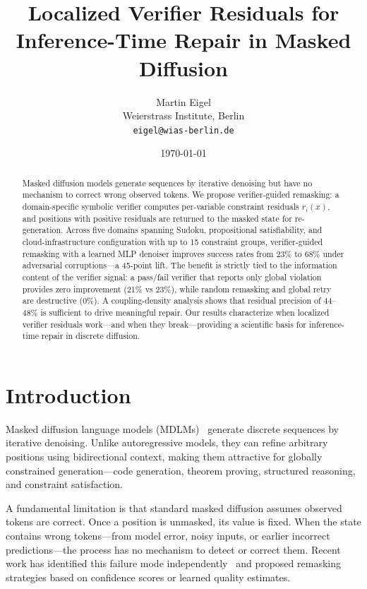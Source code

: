 \documentclass[11pt,a4paper,twoside]{article}
\title{Localized Verifier Residuals for Inference-Time Repair in Masked Diffusion}
\author{Martin Eigel\\
Weierstrass Institute, Berlin\\[4pt]
\texttt{eigel@wias-berlin.de}}
\date{\today}
\theoremstyle{definition}
\begin{document}
\maketitle

\begin{abstract}
Masked diffusion models generate sequences by iterative denoising but have no mechanism to correct wrong observed tokens. We propose verifier-guided remasking: a domain-specific symbolic verifier computes per-variable constraint residuals $r_i(x)$, and positions with positive residuals are returned to the masked state for re-generation.
%
Across five domains spanning Sudoku, propositional satisfiability, and cloud-infrastructure configuration with up to 15 constraint groups, verifier-guided remasking with a learned MLP denoiser improves success rates from 23\% to 68\% under adversarial corruptions---a 45-point lift. The benefit is strictly tied to the information content of the verifier signal: a pass/fail verifier that reports only global violation provides zero improvement (21\% vs 23\%), while random remasking and global retry are destructive (0\%). A coupling-density analysis shows that residual precision of 44--48\% is sufficient to drive meaningful repair. Our results characterize when localized verifier residuals work---and when they break---providing a scientific basis for inference-time repair in discrete diffusion.
\end{abstract}

\section{Introduction}
\label{sec:intro}

Masked diffusion language models (MDLMs)~\cite{austin2021structured,chang2022masked,savinov2021step} generate discrete sequences by iterative denoising. Unlike autoregressive models, they can refine arbitrary positions using bidirectional context, making them attractive for globally constrained generation---code generation, theorem proving, structured reasoning, and constraint satisfaction.

A fundamental limitation is that standard masked diffusion assumes observed tokens are correct. Once a position is unmasked, its value is fixed. When the state contains wrong tokens---from model error, noisy inputs, or earlier incorrect predictions---the process has no mechanism to detect or correct them. Recent work has identified this failure mode independently~\cite{remdm2025, remedi2025, prism2025} and proposed remasking strategies based on confidence scores or learned quality estimates.
\end{document}
